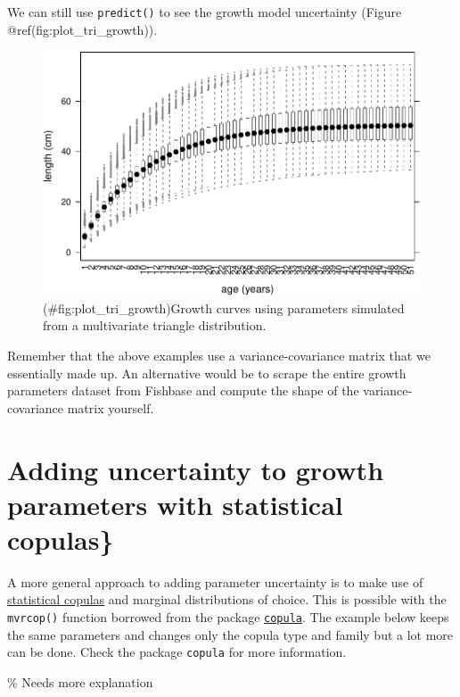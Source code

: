 \documentclass[
]{book}
\begin{document}
We can still use \texttt{predict()} to see the growth model uncertainty (Figure @ref(fig:plot\_tri\_growth)).

\begin{figure}
\centering
\includegraphics{_main_files/figure-latex/plot_tri_growth-1.pdf}
\caption{(\#fig:plot\_tri\_growth)Growth curves using parameters simulated from a multivariate triangle distribution.}
\end{figure}

Remember that the above examples use a variance-covariance matrix that we essentially made up. An alternative would be to scrape the entire growth parameters dataset from Fishbase and compute the shape of the variance-covariance matrix yourself.

\hypertarget{adding-uncertainty-to-growth-parameters-with-statistical-copulas}{%
\section{Adding uncertainty to growth parameters with statistical copulas\}}\label{adding-uncertainty-to-growth-parameters-with-statistical-copulas}}

A more general approach to adding parameter uncertainty is to make use of \href{http://www.encyclopediaofmath.org/index.php/Copula}{statistical copulas} and marginal distributions of choice. This is possible with the \texttt{mvrcop()} function borrowed from the package \href{http://cran.r-project.org/web/packages/copula/}{\texttt{copula}}. The example below keeps the same parameters and changes only the copula type and family but a lot more can be done. Check the package \texttt{copula} for more information.

\% Needs more explanation
\end{document}
